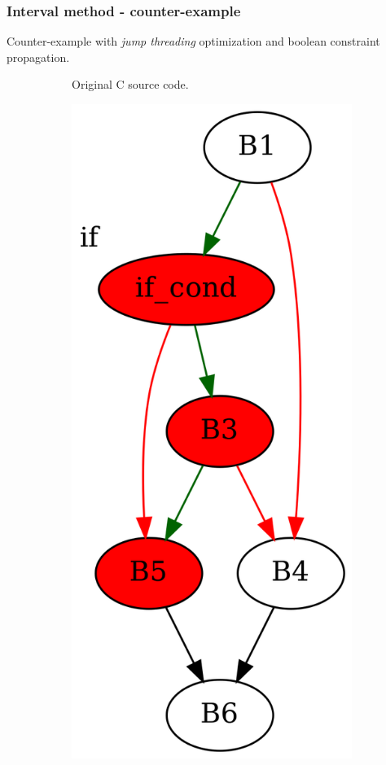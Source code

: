 \documentclass[aspectratio=1610]{beamer}
\begin{document}
\begin{frame}[noframenumbering]
	\frametitle{Interval method - counter-example}
	Counter-example with \textit{jump threading} optimization and boolean constraint propagation.
	\begin{figure}[htbp]
		\centering
		\begin{subfigure}[b]{0.30\textwidth}
			\centering
			
			\caption{Original C source code.}
		\end{subfigure}
		\begin{subfigure}[b]{0.50\textwidth}
			\centering
			\includegraphics[height=0.5\paperheight]{inc/methods/interval/counter-example/bool_propagation_jump/f_0001a.png}

\end{subfigure}
\end{figure}
\end{frame}
\end{document}
